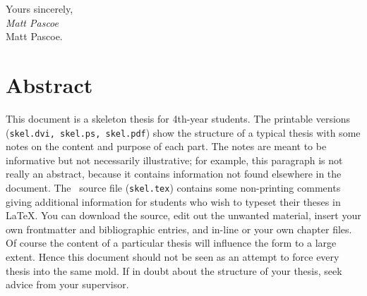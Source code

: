 \documentclass[12pt,openany,a4paper]{book}
\begin{document}
\begin{flushright}
	Yours sincerely,\\
	\medskip
	\emph{Matt Pascoe}\\
	\medskip
	Matt Pascoe.
\end{flushright}
\newpage


%












\chapter{Abstract}
This document is a skeleton thesis for 4th-year students.  The
printable versions (\texttt{skel.dvi, skel.ps, skel.pdf})
show the structure of a typical thesis with some notes on the content
and purpose of each part.  The notes are meant to be informative but
not necessarily illustrative; for example, this paragraph is not
really an abstract, because it contains information not found
elsewhere in the document.  The \LaTeXe\ source file
(\texttt{skel.tex}) contains some non-printing comments giving
additional information for students who wish to typeset their theses
in \LaTeX.  You can download the source, edit out the unwanted
material, insert your own frontmatter and bibliographic entries, and
in-line or \verb++ your own chapter files.  Of course the
content of a particular thesis will influence the form to a large
extent.  Hence this document should not be seen as an attempt to force
every thesis into the same mold.  If in doubt about the structure of
your thesis, seek advice from your supervisor.
\newpage
\end{document}
